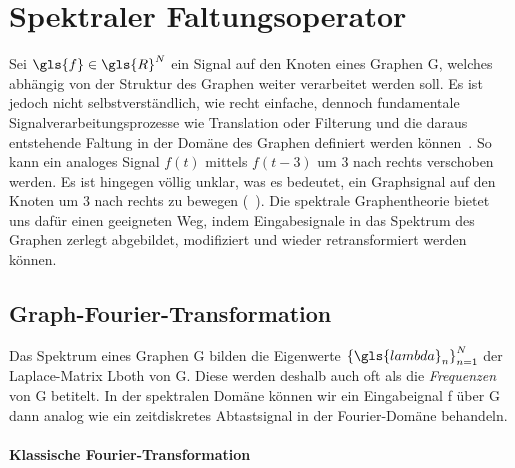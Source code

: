 \section{Spektraler Faltungsoperator}
\label{spektraler_faltungsoperator}

Sei $\gls{f} \in \gls{R}^N$ ein Signal auf den Knoten eines Graphen \gls{G}, welches abhängig von der Struktur des Graphen weiter verarbeitet werden soll.
Es ist jedoch nicht selbstverständlich, wie recht einfache, dennoch fundamentale Signalverarbeitungsprozesse wie Translation oder Filterung und die daraus entstehende Faltung in der Domäne des Graphen definiert werden können~\cite{Shuman}.
So kann ein analoges Signal $f\left(t\right)$ \bspw{} mittels $f\left(t-3\right)$ um $3$ nach rechts verschoben werden.
Es ist hingegen völlig unklar, was es bedeutet, ein Graphsignal auf den Knoten um $3$ nach rechts zu bewegen (\vgl{}~\cite{Shuman}).
Die spektrale Graphentheorie bietet uns dafür einen geeigneten Weg, indem Eingabesignale in das Spektrum des Graphen zerlegt \bzw{} abgebildet, modifiziert und wieder retransformiert werden können.

\subsection{Graph-Fourier-Transformation}
\label{graph_fourier_transformation}

Das Spektrum eines Graphen \gls{G} bilden die Eigenwerte ${\left\{\gls{lambda}_n\right\}}_{n=1}^N$ der Laplace-Matrix \gls{Lboth} von \gls{G}.
Diese werden deshalb auch oft als die \emph{Frequenzen} von \gls{G} betitelt.
In der spektralen Domäne können wir ein Eingabeignal \gls{f} über \gls{G} dann analog wie ein zeitdiskretes Abtastsignal in der Fourier-Domäne behandeln.

\paragraph{Klassische Fourier-Transformation}
\label{klassische_fourier_transformation}

